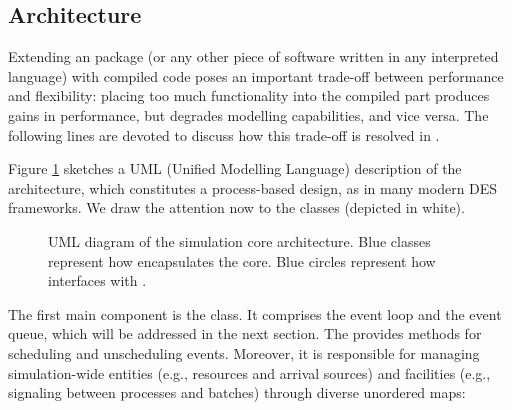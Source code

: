 \documentclass[
  nojss]{jss}
\begin{document}
\subsection{Architecture}\label{architecture}

Extending an  package (or any other piece of software
written in any interpreted language) with compiled code poses an
important trade-off between performance and flexibility: placing too
much functionality into the compiled part produces gains in performance,
but degrades modelling capabilities, and vice versa. The following lines
are devoted to discuss how this trade-off is resolved in .

Figure \ref{architecture} sketches a UML (Unified Modelling Language)
description of the architecture, which constitutes a process-based
design, as in many modern DES frameworks. We draw the attention now to
the  classes (depicted in white).

\begin{figure}
\centering
{}
\caption{UML diagram of the simulation core architecture. Blue classes
represent how  encapsulates the  core. Blue
circles represent how  interfaces with
.\label{architecture}}
\end{figure}

The first main component is the  class. It comprises the
event loop and the event queue, which will be addressed in the next
section. The  provides methods for scheduling and
unscheduling events. Moreover, it is responsible for managing
simulation-wide entities (e.g., resources and arrival sources) and
facilities (e.g., signaling between processes and batches) through
diverse  unordered maps:
\end{document}
